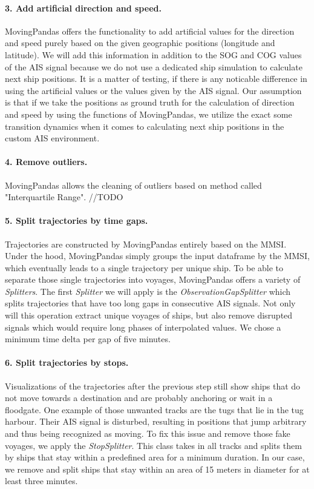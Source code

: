 \paragraph{3. Add artificial direction and speed.}
MovingPandas offers the functionality to add artificial values for the direction and speed purely based on the given geographic positions (longitude and latitude). We will add this information in addition to the SOG and COG values of the AIS signal because we do not use a dedicated ship simulation to calculate next ship positions. It is a matter of testing, if there is any noticable difference in using the artificial values or the values given by the AIS signal. Our assumption is that if we take the positions as ground truth for the calculation of direction and speed by using the functions of MovingPandas, we utilize the exact some transition dynamics when it comes to calculating next ship positions in the custom AIS environment.

\paragraph{4. Remove outliers.}
MovingPandas allows the cleaning of outliers based on method called "Interquartile Range". 
//TODO

\paragraph{5. Split trajectories by time gaps.}
Trajectories are constructed by MovingPandas entirely based on the MMSI. Under the hood, MovingPandas simply groups the input dataframe by the MMSI, which eventually leads to a single trajectory per unique ship. To be able to separate those single trajectories into voyages, MovingPandas offers a variety of \textit{Splitters}. The first \textit{Splitter} we will apply is the \textit{ObservationGapSplitter} which splits trajectories that have too long gaps in consecutive AIS signals. Not only will this operation extract unique voyages of ships, but also remove disrupted signals which would require long phases of interpolated values.
We chose a minimum time delta per gap of five minutes.

\paragraph{6. Split trajectories by stops.}
Visualizations of the trajectories after the previous step still show ships that do not move towards a destination and are probably anchoring or wait in a floodgate. One example of those unwanted tracks are the tugs that lie in the tug harbour. Their AIS signal is disturbed, resulting in positions that jump arbitrary and thus being recognized as moving. To fix this issue and remove those fake voyages, we apply the \textit{StopSplitter}. This class takes in all tracks and splits them by ships that stay within a predefined area for a minimum duration. In our case, we remove and split ships that stay within an area of 15 meters in diameter for at least three minutes.



